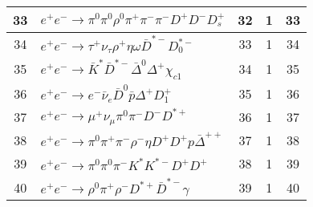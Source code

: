\documentclass[landscape]{article}
\begin{document}
\begin{table}[htbp!]
\begin{tabular}{|c|>{\centering}p{18cm}|c|c|c|}
\hline
33 & $ e^{+} e^{-} \rightarrow \pi^{0} \pi^{0} \rho^{0} \pi^{+} \pi^{-} \pi^{-} D^{+} D^{-} D_{s}^{+} $ & 32 & 1 & 33 \\
\hline
34 & $ e^{+} e^{-} \rightarrow \tau^{+} \nu_{\tau} \rho^{+} \eta \omega \bar{D}^{*-} D_{0}^{*-} $ & 33 & 1 & 34 \\
\hline
35 & $ e^{+} e^{-} \rightarrow \bar{K}^{*} \bar{D}^{*-} \bar{\Delta}^{0} \Delta^{+} \chi_{c1} $ & 34 & 1 & 35 \\
\hline
36 & $ e^{+} e^{-} \rightarrow e^{-} \bar{\nu}_{e} \bar{D}^{0} \bar{p} \Delta^{+} D_{1}^{+} $ & 35 & 1 & 36 \\
\hline
37 & $ e^{+} e^{-} \rightarrow \mu^{+} \nu_{\mu} \pi^{0} \pi^{-} D^{-} D^{*+} $ & 36 & 1 & 37 \\
\hline
38 & $ e^{+} e^{-} \rightarrow \pi^{0} \pi^{+} \pi^{-} \rho^{-} \eta D^{+} D^{+} p \bar{\Delta}^{++} $ & 37 & 1 & 38 \\
\hline
39 & $ e^{+} e^{-} \rightarrow \pi^{0} \pi^{0} \pi^{-} K^{*} K^{*-} D^{+} D^{+} $ & 38 & 1 & 39 \\
\hline
40 & $ e^{+} e^{-} \rightarrow \rho^{0} \pi^{+} \rho^{-} D^{*+} \bar{D}^{*-} \gamma $ & 39 & 1 & 40 \\
\hline
\end{tabular}
\end{table}

\clearpage
\end{document}
